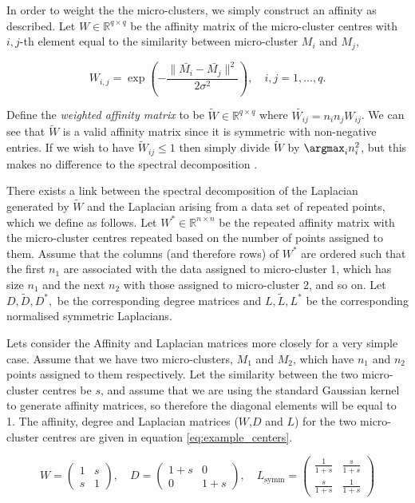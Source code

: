 In order to weight the the micro-clusters, we simply construct an affinity as described. 
Let $W \in \mathbb{R}^{q \times q}$ be the affinity matrix of the micro-cluster centres with $i,j$-th element equal to the similarity between micro-cluster $M_i$ and $M_j$, 

\[ W_{i,j} = \exp \left(- \frac{\| \bar{M_i} - \bar{M_j}\|^2}{2 \sigma^2} \right), \quad i, j = 1, \ldots, q. \]

Define the \textit{weighted affinity matrix} to be $\tilde{W} \in \mathbb{R}^{q \times q}$ where $ \tilde{W_{ij}} = n_in_jW_{ij}$. We can see that $\tilde{W}$ is a valid affinity matrix since it is symmetric with non-negative entries. If we wish to have $\tilde{W}_{ij} \leq 1$ then simply divide $\tilde{W}$ by $\argmax_i n_i^2$, but this makes no difference to the spectral decomposition \citep{Luxburg2008}. 

There exists a link between the spectral decomposition of  the Laplacian generated by $\tilde{W}$ and the Laplacian arising from a data set of repeated points, which we define as follows.  Let $W^* \in \mathbb{R}^{n \times n}$ be the repeated affinity matrix with the micro-cluster centres repeated based on the number of points assigned to them. Assume that the columns (and therefore rows) of $W^*$ are ordered such that the first $n_1$ are associated with the data assigned to micro-cluster 1, which has size $n_1$ and the next $n_2$ with those assigned to micro-cluster 2, and so on. Let $D, \tilde{D}, D^{*},$ be the corresponding degree matrices and $L, \tilde{L}, L^{*}$ be the corresponding normalised symmetric Laplacians.

Lets consider the Affinity and Laplacian matrices more closely for a very simple case. Assume that we have two micro-clusters, $M_1$ and $M_2$,  which have $n_1$ and $n_2$ points assigned to them respectively. Let the similarity between the two micro-cluster centres be $s$, and assume that we are using the standard Gaussian kernel to generate affinity matrices, so therefore the diagonal elements will be equal to 1. The affinity, degree and Laplacian matrices ($W$,$D$ and $L$) for the two micro-cluster centres are given in equation \eqref{eq:example_centers}.

\begin{equation}
  \label{eq:example_centers}
 W = \left(
  \begin{array}{cc}
    1 & s \\
    s & 1
  \end{array} \right), \quad
%
 D = \left(
  \begin{array}{cc}
    1+s & 0 \\
    0 & 1+s
  \end{array} \right), \quad
%
 L_{\text{symm}} = \left(
  \begin{array}{cc}
    \frac{1}{1+s} & \frac{s}{1+s} \\
    \frac{s}{1+s} & \frac{1}{1+s} 
  \end{array} \right) 
\end{equation}

